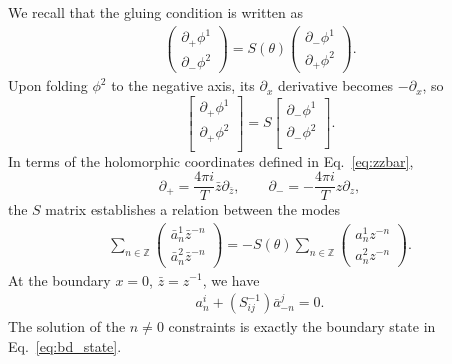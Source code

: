 We recall that the gluing condition is written as
\begin{equation}
\begin{aligned}
\label{eq:def_S_in_app}
\begin{pmatrix}
\partial_+\phi^1\\
\partial_-\phi^2
\end{pmatrix}
=S(\theta)
\begin{pmatrix}
\partial_-\phi^1\\
\partial_+\phi^2
\end{pmatrix}.
\end{aligned}
\end{equation}
Upon folding $\phi^2$ to the negative axis, its $\partial_x$ derivative becomes $-\partial_x$, so 
\begin{equation}
\begin{bmatrix}
\partial_{+} \phi^1 \\
\partial_{+} \phi^2 \\
\end{bmatrix}
 = S
\begin{bmatrix}
\partial_{-} \phi^1 \\
\partial_{-} \phi^2 \\
\end{bmatrix}.
\end{equation}
In terms of the holomorphic coordinates defined in Eq.~\eqref{eq:zzbar}, 
\begin{equation}
\partial_{+} = \frac{4\pi i }{T} \bar{z} \partial_{\bar{z}} ,\qquad \partial_{-} = -\frac{4\pi i }{T} z\partial_{z},
\end{equation}
the $S$ matrix establishes a relation between the modes
\begin{equation}
\begin{aligned}
\label{eq:def_S_in_app_2}
\sum_{n\in\mathbb{Z}}
\begin{pmatrix}
\bar{a}_n^1\bar{z}^{-n}\\
\bar{a}_n^2\bar{z}^{-n}
\end{pmatrix}
= -S(\theta)
\sum_{n\in\mathbb{Z}}
\begin{pmatrix}
a_n^1{z}^{-n}\\
a_n^2{z}^{-n}
\end{pmatrix}.
\end{aligned}
\end{equation}
At the boundary $x = 0$, $\bar{z}=z^{-1}$, we have
\begin{equation}
\begin{aligned}
a^i_n + (S^{-1}_{ij})\bar{a}^j_{-n}=0.
\end{aligned}
\end{equation}
The solution of the $n \ne 0$ constraints is exactly the boundary state in Eq.~\eqref{eq:bd_state}. 

